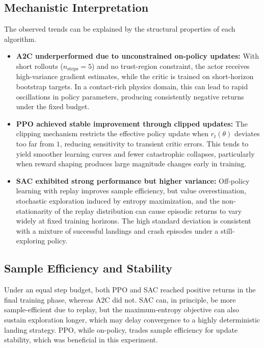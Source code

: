 \documentclass[a4paper,11pt,notitlepage]{report}
\begin{document}
\subsection{Mechanistic Interpretation}
The observed trends can be explained by the structural properties of each algorithm.
\begin{itemize}
    \item \textbf{A2C underperformed due to unconstrained on-policy updates:} With short rollouts ($n_{\mathrm{steps}}=5$) and no trust-region constraint, the actor receives high-variance gradient estimates, while the critic is trained on short-horizon bootstrap targets. In a contact-rich physics domain, this can lead to rapid oscillations in policy parameters, producing consistently negative returns under the fixed budget.
    \item \textbf{PPO achieved stable improvement through clipped updates:} The clipping mechanism restricts the effective policy update when $r_t(\theta)$ deviates too far from $1$, reducing sensitivity to transient critic errors. This tends to yield smoother learning curves and fewer catastrophic collapses, particularly when reward shaping produces large magnitude changes early in training.
    \item \textbf{SAC exhibited strong performance but higher variance:} Off-policy learning with replay improves sample efficiency, but value overestimation, stochastic exploration induced by entropy maximization, and the non-stationarity of the replay distribution can cause episodic returns to vary widely at fixed training horizons. The high standard deviation is consistent with a mixture of successful landings and crash episodes under a still-exploring policy.
\end{itemize}

\subsection{Sample Efficiency and Stability}
Under an equal step budget, both PPO and SAC reached positive returns in the final training phase, whereas A2C did not. SAC can, in principle, be more sample-efficient due to replay, but the maximum-entropy objective can also sustain exploration longer, which may delay convergence to a highly deterministic landing strategy. PPO, while on-policy, trades sample efficiency for update stability, which was beneficial in this experiment.
\end{document}
